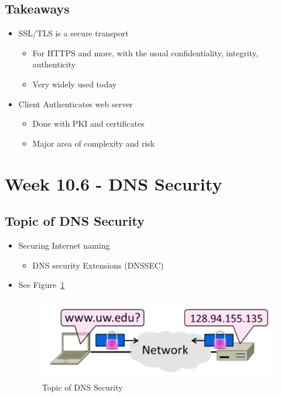 \documentclass[12pt]{ctexart}   %
\begin{document}
	\subsection{Takeaways}
	\begin{itemize}
		\item SSL/TLS is a secure transport
		\begin{itemize}
			\item For HTTPS and more, with the usual confidentiality, integrity, authenticity
			\item Very widely used today
		\end{itemize}

		\item Client Authenticates web server
		\begin{itemize}
			\item Done with PKI and certificates
			\item Major area of complexity and risk
		\end{itemize}
	\end{itemize}

\section{Week 10.6 - DNS Security}
	\subsection{Topic of DNS Security}
	\begin{itemize}
		\item Securing Internet naming
		\begin{itemize}
			\item DNS security Extensions (DNSSEC)
		\end{itemize}
		\item See Figure~\ref{fig:10-6-1}
		  
		\begin{figure}[h!] %
		\centering
		\includegraphics[scale=0.7]{images/10-6-1}
		\caption{Topic of DNS Security}
		\label{fig:10-6-1}
		\end{figure}
	\end{itemize}
\end{document}
